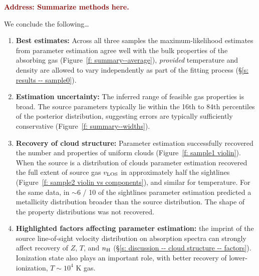 \documentclass[fleqn,usenatbib]{mnras}
\newcommand{\todo}[1]{\textcolor{Maroon}{\textbf{Address: #1}}}
\begin{document}
\todo{Summarize methods here.}

We conclude the following\ldots
\begin{enumerate}
    \item \textbf{Best estimates:} Across all three samples the maximum-likelihood estimates from parameter estimation agree well with the bulk properties of the absorbing gas (Figure~\ref{f: summary--average}), \textit{provided} temperature and density are allowed to vary independently as part of the fitting process (\S\ref{s: results -- sample0}).
    \item \textbf{Estimation uncertainty:} The inferred range of feasible gas properties is broad. The source parameters typically lie within the 16th to 84th percentiles of the posterior distribution, suggesting errors are typically sufficiently conservative (Figure~\ref{f: summary--widths}).
    \item \textbf{Recovery of cloud structure:} Parameter estimation successfully recovered the number and properties of uniform clouds (Figure~\ref{f: sample1 violin}). When the source is a distribution of clouds parameter estimation recovered the full extent of source gas $v_{\rm LOS}$ in approximately half the sightlines (Figure~\ref{f: sample2 violin vs components}), and similar for temperature. For the same data, in $\sim 6$ / 10 of the sightlines parameter estimation predicted a metallicity distribution broader than the source distribution. The shape of the property distributions was not recovered.
    \item \textbf{Highlighted factors affecting parameter estimation:} the imprint of the source line-of-sight velocity distribution on absorption spectra can strongly affect recovery of $Z$, $T$, and $n_{\rm H}$ (\S\ref{s: discussion -- cloud structure -- factors}). Ionization state also plays an important role, with better recovery of lower-ionization, $T \sim 10^4$ K gas.
\end{enumerate}
\end{document}
